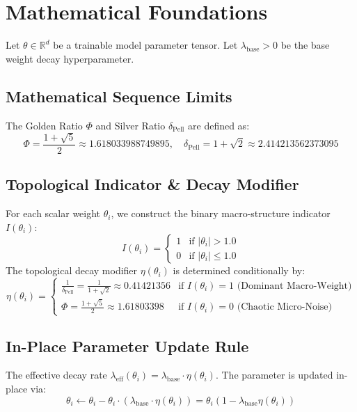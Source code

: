 \section{Mathematical Foundations}
Let $\theta \in \mathbb{R}^d$ be a trainable model parameter tensor. Let $\lambda_{\text{base}} > 0$ be the base weight decay hyperparameter.

\subsection{Mathematical Sequence Limits}
The Golden Ratio $\Phi$ and Silver Ratio $\delta_{\text{Pell}}$ are defined as:
\begin{equation}
    \Phi = \frac{1 + \sqrt{5}}{2} \approx 1.618033988749895, \quad \delta_{\text{Pell}} = 1 + \sqrt{2} \approx 2.414213562373095
\end{equation}

\subsection{Topological Indicator \& Decay Modifier}
For each scalar weight $\theta_i$, we construct the binary macro-structure indicator $I(\theta_i)$:
\begin{equation}
    I(\theta_i) = \begin{cases} 1 & \text{if } |\theta_i| > 1.0 \\ 0 & \text{if } |\theta_i| \le 1.0 \end{cases}
\end{equation}
The topological decay modifier $\eta(\theta_i)$ is determined conditionally by:
\begin{equation}
    \eta(\theta_i) = \begin{cases} \frac{1}{\delta_{\text{Pell}}} = \frac{1}{1 + \sqrt{2}} \approx 0.41421356 & \text{if } I(\theta_i) = 1 \text{ (Dominant Macro-Weight)} \\ \Phi = \frac{1 + \sqrt{5}}{2} \approx 1.61803398 & \text{if } I(\theta_i) = 0 \text{ (Chaotic Micro-Noise)} \end{cases}
\end{equation}

\subsection{In-Place Parameter Update Rule}
The effective decay rate $\lambda_{\text{eff}}(\theta_i) = \lambda_{\text{base}} \cdot \eta(\theta_i)$. The parameter is updated in-place via:
\begin{equation}
    \theta_i \leftarrow \theta_i - \theta_i \cdot \left( \lambda_{\text{base}} \cdot \eta(\theta_i) \right) = \theta_i \left( 1 - \lambda_{\text{base}} \eta(\theta_i) \right)
\end{equation}